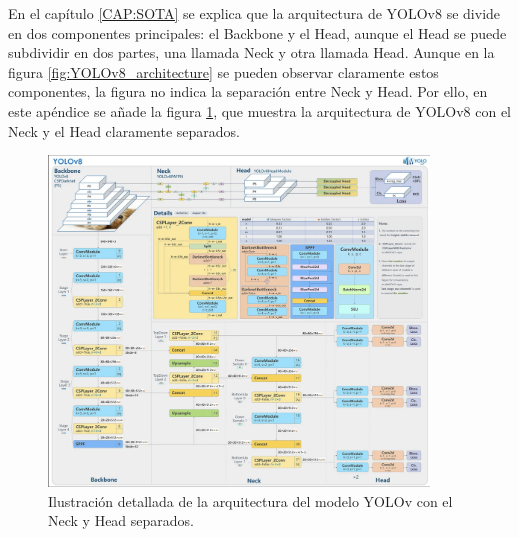 En el capítulo \ref{CAP:SOTA} se explica que la arquitectura de YOLOv8 se divide en dos componentes principales: el Backbone y el Head, aunque el Head se puede subdividir en dos partes, una llamada Neck y otra llamada Head. Aunque en la figura \ref{fig:YOLOv8_architecture} se pueden observar claramente estos componentes, la figura no indica la separación entre Neck y Head. Por ello, en este apéndice se añade la figura \ref{fig:YOLOv8_architecture_neck_head}, que muestra la arquitectura de YOLOv8 con el Neck y el Head claramente separados.

\begin{figure}[H]
    \centering
    \includegraphics[width=0.9\textwidth]{../img/yolov8-arq3.png}
    \caption{Ilustración detallada de la arquitectura del modelo YOLOv con el Neck y Head separados. \cite{yolov8-arq-neck}}
    \label{fig:YOLOv8_architecture_neck_head}
\end{figure}

